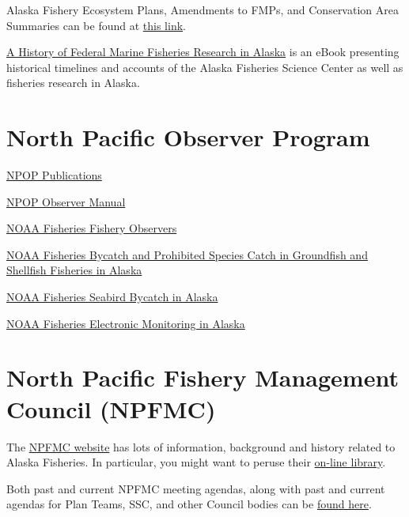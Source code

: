 \documentclass[
  letterpaper,
  DIV=11,
  numbers=noendperiod]{scrreprt}
\begin{document}
Alaska Fishery Ecosystem Plans, Amendments to FMPs, and Conservation
Area Summaries can be found at
\href{https://www.npfmc.org/library/fmps-feps/}{this link}.

\href{https://www.fisheries.noaa.gov/resource/outreach-materials/history-federal-marine-fisheries-research-alaska}{A
History of Federal Marine Fisheries Research in Alaska} is an eBook
presenting historical timelines and accounts of the Alaska Fisheries
Science Center as well as fisheries research in Alaska.

\chapter{North Pacific Observer
Program}\label{north-pacific-observer-program}

\href{https://www.fisheries.noaa.gov/resource/document/north-pacific-observer-program-publications}{NPOP
Publications}

\href{https://www.fisheries.noaa.gov/resource/document/north-pacific-observer-sampling-manual}{NPOP
Observer Manual}

\href{https://www.fisheries.noaa.gov/topic/fishery-observers/overview}{NOAA
Fisheries Fishery Observers}

\href{https://www.fisheries.noaa.gov/alaska/bycatch/bycatch-and-prohibited-species-catch-groundfish-and-shellfish-fisheries-alaska}{NOAA
Fisheries Bycatch and Prohibited Species Catch in Groundfish and
Shellfish Fisheries in Alaska}

\href{https://www.fisheries.noaa.gov/alaska/bycatch/seabird-bycatch-alaska}{NOAA
Fisheries Seabird Bycatch in Alaska}

\href{https://www.fisheries.noaa.gov/alaska/resources-fishing/electronic-monitoring-alaska}{NOAA
Fisheries Electronic Monitoring in Alaska}

\chapter{North Pacific Fishery Management Council
(NPFMC)}\label{north-pacific-fishery-management-council-npfmc}

The \href{https://www.npfmc.org/}{NPFMC website} has lots of
information, background and history related to Alaska Fisheries. In
particular, you might want to peruse their
\href{https://www.npfmc.org/library/}{on-line library}.

Both past and current NPFMC meeting agendas, along with past and current
agendas for Plan Teams, SSC, and other Council bodies can be
\href{https://meetings.npfmc.org/}{found here}.
\end{document}
